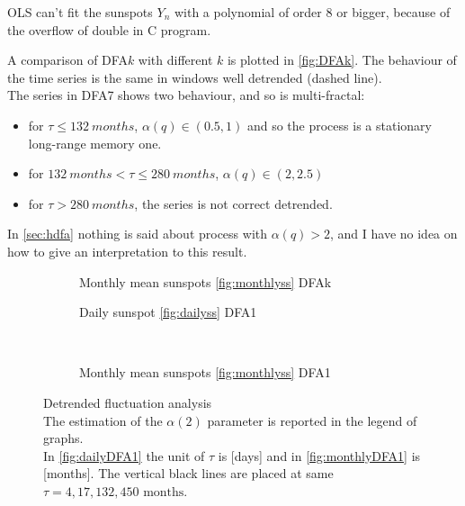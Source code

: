 OLS can't fit the sunspots $Y_n$ with a polynomial of order 8 or bigger, because of the overflow of double in C program.

A comparison of DFA$k$ with different $k$ is plotted in \autoref{fig:DFAk}. 
The behaviour of the time series is the same in windows well detrended (dashed line).\\ 
The series in DFA7 shows two behaviour, and so is multi-fractal:
\begin{itemize}
	\item for $\tau \le \SI{132}{months}$, $\alpha(q) \in (0.5, 1)$ and so the process is a stationary long-range memory one.
	\item for $\SI{132}{months} < \tau \le \SI{280}{months}$, $\alpha(q) \in (2, 2.5)$ 
	\item for $\tau > \SI{280}{months}$, the series is not correct detrended.
\end{itemize}

In \autoref{sec:hdfa} nothing is said about process with $\alpha(q)>2$, and I have no idea on how to give an interpretation to this result. 

\begin{figure}[!h]
	\centering
	\begin{subfigure}{\textwidth}
		
		\caption{Monthly mean sunspots \ref{fig:monthlyss} DFAk}\label{fig:DFAk}
	\end{subfigure}

	\begin{subfigure}{0.48\textwidth}
		
		\caption{Daily sunspot \ref{fig:dailyss} DFA1}\label{fig:dailyDFA1}
	\end{subfigure}
	~
	\begin{subfigure}{0.48\textwidth}
		
		\caption{Monthly mean sunspots \ref{fig:monthlyss} DFA1}\label{fig:monthlyDFA1}
	\end{subfigure}
	\caption{Detrended fluctuation analysis\\
	The estimation of the $\alpha(2)$ parameter is reported in the legend of graphs.\\
	In \autoref{fig:dailyDFA1} the unit of $\tau$ is [days] and in \autoref{fig:monthlyDFA1} is [months]. The vertical black lines are placed at same $\tau = 4,17, 132, 450 \text{ months}$.}\label{fig:DFA}
\end{figure}

%		
%	
%		
%		
